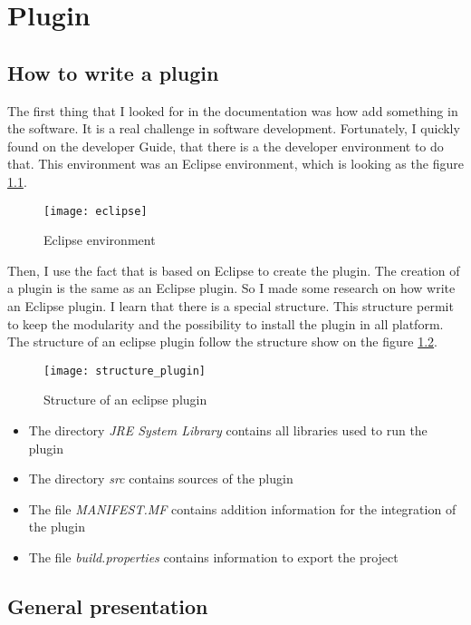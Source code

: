 
\chapter{Plugin}
\label{chap:results}


\section{How to write a plugin}


The first thing that I looked for in the \umld documentation was how add something in the software. It is a real challenge in software development. Fortunately, I quickly found on the \umld developer Guide, that there is a the developer environment to do that. This environment was an Eclipse environment, which is looking as the figure \ref{fig:eclipse}.

\begin{figure}[h]
  \centering
  \texttt{[image: eclipse]}
  \caption{Eclipse environment}
  \label{fig:eclipse}
\end{figure}

Then, I use the fact that \umld is based on Eclipse to create the plugin. The creation of a plugin is the same as an Eclipse plugin. So I made some research on how write an Eclipse plugin. I learn that there is a special structure. This structure permit to keep the modularity and the possibility to install the plugin in all platform. The structure of an eclipse plugin follow the structure show on the figure \ref{fig:plugin}.

\begin{figure}[h]
  \centering
  \texttt{[image: structure\_plugin]}
  \caption{Structure of an eclipse plugin}
  \label{fig:plugin}
\end{figure}

\noitemsep
\begin{itemize}
\item The directory \textit{JRE System Library} contains all libraries used to run the plugin
\item The directory \textit{src} contains sources of the plugin
\item The file \textit{MANIFEST.MF} contains addition information for the integration of the plugin
\item The file \textit{build.properties} contains information to export the project
\end{itemize}
\doitemsep

\section{General presentation}

